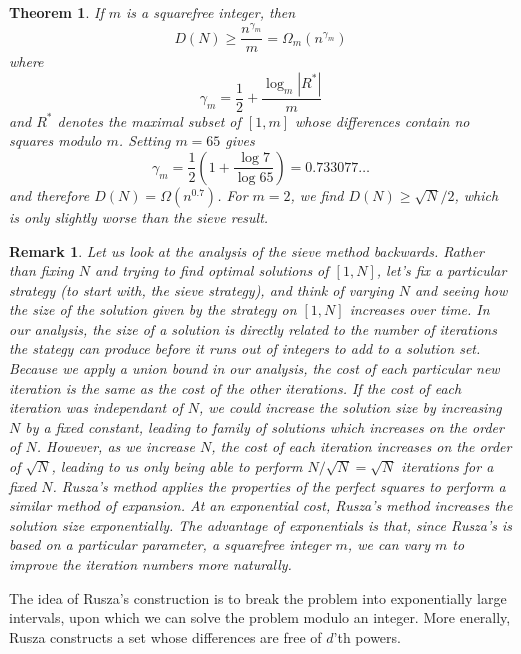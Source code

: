 \documentclass{report}
\theoremstyle{plain}
\theoremstyle{plain}
\newtheorem{theorem}{Theorem}
\newtheorem*{remark}{Remark}
\begin{document}
\begin{theorem}
    If $m$ is a squarefree integer, then
    \[ D(N) \geq \frac{n^{\gamma_m}}{m} = \Omega_m(n^{\gamma_m}) \]
    where
    \[ \gamma_m = \frac{1}{2} + \frac{\log_m |R^*|}{m} \]
    and $R^*$ denotes the maximal subset of $[1,m]$ whose differences contain no squares modulo $m$. Setting $m = 65$ gives
    \[ \gamma_m = \frac{1}{2} \left( 1 + \frac{\log 7}{\log 65} \right) = 0.733077 \dots \]
    and therefore $D(N) = \Omega(n^{0.7})$. For $m = 2$, we find $D(N) \geq \sqrt{N}/2$, which is only slightly worse than the sieve result.
\end{theorem}

\begin{remark}
    Let us look at the analysis of the sieve method backwards. Rather than fixing $N$ and trying to find optimal solutions of $[1,N]$, let's fix a particular strategy (to start with, the sieve strategy), and think of varying $N$ and seeing how the size of the solution given by the strategy on $[1,N]$ increases over time. In our analysis, the size of a solution is directly related to the number of iterations the stategy can produce before it runs out of integers to add to a solution set. Because we apply a union bound in our analysis, the cost of each particular new iteration is the same as the cost of the other iterations. If the cost of each iteration was independant of $N$, we could increase the solution size by increasing $N$ by a fixed constant, leading to family of solutions which increases on the order of $N$. However, as we increase $N$, the cost of each iteration increases on the order of $\sqrt{N}$, leading to us only being able to perform $N/\sqrt{N} = \sqrt{N}$ iterations for a fixed $N$. Rusza's method applies the properties of the perfect squares to perform a similar method of expansion. At an exponential cost, Rusza's method increases the solution size exponentially. The advantage of exponentials is that, since Rusza's is based on a particular parameter, a squarefree integer $m$, we can vary $m$ to improve the iteration numbers more naturally.
\end{remark}

The idea of Rusza's construction is to break the problem into exponentially large intervals, upon which we can solve the problem modulo an integer. More enerally, Rusza constructs a set whose differences are free of $d$'th powers.
\end{document}
